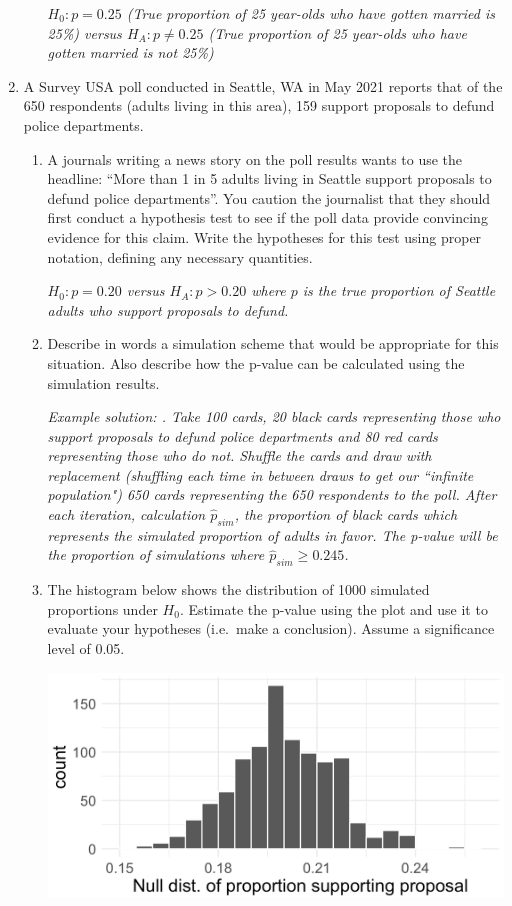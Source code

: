 \documentclass[12pt]{article}   	%
\newcommand{\soln}[2]{\textit{\textcolor{custom_red}{#2}}}{}
\begin{document}
\begin{enumerate}
\begin{enumerate}
        \soln{}{$H_{0}: p = 0.25$ (True proportion of 25 year-olds who have gotten married is 25\%) versus $H_{A}: p \neq 0.25$ (True proportion of 25 year-olds who have gotten married is not 25\%) }
        
  \end{enumerate}
\item
  A Survey USA poll conducted in Seattle, WA in May 2021 reports that of
  the 650 respondents (adults living in this area), 159 support
  proposals to defund police departments.

  \begin{enumerate}
  \item
    A journals writing a news story on the poll results wants to use the
    headline: ``More than 1 in 5 adults living in Seattle support
    proposals to defund police departments''. You caution the journalist
    that they should first conduct a hypothesis test to see if the poll
    data provide convincing evidence for this claim. Write the
    hypotheses for this test using proper notation, defining any
    necessary quantities.
    
    \soln{}{$H_{0}: p = 0.20$ versus $H_{A}: p > 0.20$ where $p$ is the true proportion of Seattle adults who support proposals to defund.}
  \item
    Describe in words a simulation scheme that would be appropriate for
    this situation. Also describe how the p-value can be calculated
    using the simulation results.
    
    \soln{}{Example solution: . Take 100 cards, 20
black cards representing those who support proposals to defund police departments
and 80 red cards representing those who do not. Shuffle the cards and draw with
replacement (shuffling each time in between draws to get our ``infinite population") 650 cards representing the 650
respondents to the poll. After each iteration, calculation $\hat{p}_{sim}$, the  proportion of black cards which represents the simulated proportion of adults in favor. The p-value will be the proportion of simulations where $\hat{p}_{sim} \geq 0.245$.}
    
  \item
    The histogram below shows the distribution of 1000 simulated
    proportions under \(H_{0}\). Estimate the p-value using the plot and
    use it to evaluate your hypotheses (i.e.~make a conclusion). Assume
    a significance level of 0.05.

    \includegraphics[scale = 0.4]{images/13-defund.png}
    

\end{enumerate}
\end{enumerate}
\end{document}

